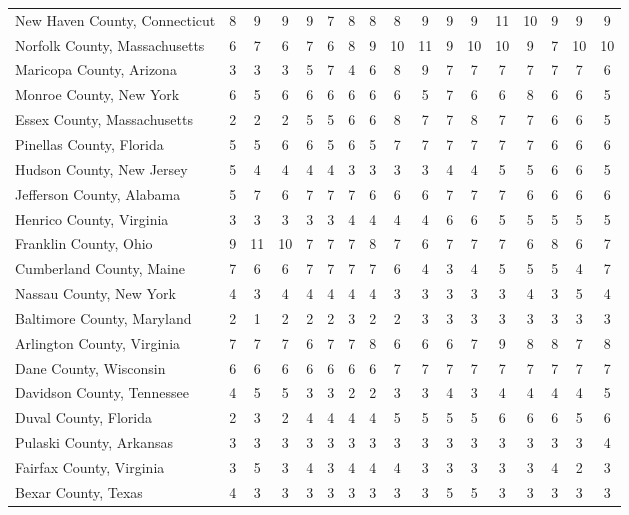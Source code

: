 \begin{landscape}
\begin{longtable}{lcccccccccccccccc}
	New Haven County, Connecticut & 8 & 9 & 9 & 9 & 7 & 8 & 8 & 8 & 9 & 9 & 9 & 11 & 10 & 9 & 9 & 9 \\
	Norfolk County, Massachusetts & 6 & 7 & 6 & 7 & 6 & 8 & 9 & 10 & 11 & 9 & 10 & 10 & 9 & 7 & 10 & 10 \\
	Maricopa County, Arizona & 3 & 3 & 3 & 5 & 7 & 4 & 6 & 8 & 9 & 7 & 7 & 7 & 7 & 7 & 7 & 6 \\
	Monroe County, New York & 6 & 5 & 6 & 6 & 6 & 6 & 6 & 6 & 5 & 7 & 6 & 6 & 8 & 6 & 6 & 5 \\
	Essex County, Massachusetts & 2 & 2 & 2 & 5 & 5 & 6 & 6 & 8 & 7 & 7 & 8 & 7 & 7 & 6 & 6 & 5 \\
	Pinellas County, Florida & 5 & 5 & 6 & 6 & 5 & 6 & 5 & 7 & 7 & 7 & 7 & 7 & 7 & 6 & 6 & 6 \\
	Hudson County, New Jersey & 5 & 4 & 4 & 4 & 4 & 3 & 3 & 3 & 3 & 4 & 4 & 5 & 5 & 6 & 6 & 5 \\
	Jefferson County, Alabama & 5 & 7 & 6 & 7 & 7 & 7 & 6 & 6 & 6 & 7 & 7 & 7 & 6 & 6 & 6 & 6 \\
	Henrico County, Virginia & 3 & 3 & 3 & 3 & 3 & 4 & 4 & 4 & 4 & 6 & 6 & 5 & 5 & 5 & 5 & 5 \\
	Franklin County, Ohio & 9 & 11 & 10 & 7 & 7 & 7 & 8 & 7 & 6 & 7 & 7 & 7 & 6 & 8 & 6 & 7 \\
	Cumberland County, Maine & 7 & 6 & 6 & 7 & 7 & 7 & 7 & 6 & 4 & 3 & 4 & 5 & 5 & 5 & 4 & 7 \\
	Nassau County, New York & 4 & 3 & 4 & 4 & 4 & 4 & 4 & 3 & 3 & 3 & 3 & 3 & 4 & 3 & 5 & 4 \\
	Baltimore County, Maryland & 2 & 1 & 2 & 2 & 2 & 3 & 2 & 2 & 3 & 3 & 3 & 3 & 3 & 3 & 3 & 3 \\
	Arlington County, Virginia & 7 & 7 & 7 & 6 & 7 & 7 & 8 & 6 & 6 & 6 & 7 & 9 & 8 & 8 & 7 & 8 \\
	Dane County, Wisconsin & 6 & 6 & 6 & 6 & 6 & 6 & 6 & 7 & 7 & 7 & 7 & 7 & 7 & 7 & 7 & 7 \\
	Davidson County, Tennessee & 4 & 5 & 5 & 3 & 3 & 2 & 2 & 3 & 3 & 4 & 3 & 4 & 4 & 4 & 4 & 5 \\
	Duval County, Florida & 2 & 3 & 2 & 4 & 4 & 4 & 4 & 5 & 5 & 5 & 5 & 6 & 6 & 6 & 5 & 6 \\
	Pulaski County, Arkansas & 3 & 3 & 3 & 3 & 3 & 3 & 3 & 3 & 3 & 3 & 3 & 3 & 3 & 3 & 3 & 4 \\
	Fairfax County, Virginia & 3 & 5 & 3 & 4 & 3 & 4 & 4 & 4 & 3 & 3 & 3 & 3 & 3 & 4 & 2 & 3 \\
	Bexar County, Texas & 4 & 3 & 3 & 3 & 3 & 3 & 3 & 3 & 3 & 5 & 5 & 3 & 3 & 3 & 3 & 3 \\

\end{longtable}
\end{landscape}
